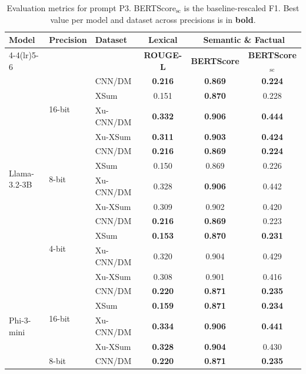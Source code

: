 \begin{table}[tbp]
\centering
\footnotesize
\setlength{\tabcolsep}{4pt}
\caption{Evaluation metrics for prompt P3. BERTScore$_{\mathrm{sc}}$ is the baseline-rescaled F1. Best value per model and dataset across precisions is in \textbf{bold}.}
\label{tab:eval-P3}
\begin{tabular}{lllccc}
\toprule
\multirow{2}{*}{\textbf{Model}} & \multirow{2}{*}{\textbf{Precision}} & \multirow{2}{*}{\textbf{Dataset}} & \textbf{Lexical} & \multicolumn{2}{c}{\textbf{Semantic \& Factual}} \\
\cmidrule(lr){4-4}\cmidrule(lr){5-6}
 & & & \textbf{ROUGE-L} & \textbf{BERTScore} & \textbf{BERTScore$_{\mathrm{sc}}$} \\
\midrule
\multirow{12}{*}{Llama-3.2-3B} & \multirow{4}{*}{16-bit} & CNN/DM & \textbf{0.216} & \textbf{0.869} & \textbf{0.224} \\
 &  & XSum & 0.151 & \textbf{0.870} & 0.228 \\
 &  & Xu-CNN/DM & \textbf{0.332} & \textbf{0.906} & \textbf{0.444} \\
 &  & Xu-XSum & \textbf{0.311} & \textbf{0.903} & \textbf{0.424} \\
\cmidrule(lr){2-6}
 & \multirow{4}{*}{8-bit} & CNN/DM & \textbf{0.216} & \textbf{0.869} & \textbf{0.224} \\
 &  & XSum & 0.150 & 0.869 & 0.226 \\
 &  & Xu-CNN/DM & 0.328 & \textbf{0.906} & 0.442 \\
 &  & Xu-XSum & 0.309 & 0.902 & 0.420 \\
\cmidrule(lr){2-6}
 & \multirow{4}{*}{4-bit} & CNN/DM & \textbf{0.216} & \textbf{0.869} & 0.223 \\
 &  & XSum & \textbf{0.153} & \textbf{0.870} & \textbf{0.231} \\
 &  & Xu-CNN/DM & 0.320 & 0.904 & 0.429 \\
 &  & Xu-XSum & 0.308 & 0.901 & 0.416 \\
\midrule
\multirow{12}{*}{Phi-3-mini} & \multirow{4}{*}{16-bit} & CNN/DM & \textbf{0.220} & \textbf{0.871} & \textbf{0.235} \\
 &  & XSum & \textbf{0.159} & \textbf{0.871} & \textbf{0.234} \\
 &  & Xu-CNN/DM & \textbf{0.334} & \textbf{0.906} & \textbf{0.441} \\
 &  & Xu-XSum & \textbf{0.328} & \textbf{0.904} & 0.430 \\
\cmidrule(lr){2-6}
 & \multirow{4}{*}{8-bit} & CNN/DM & \textbf{0.220} & \textbf{0.871} & \textbf{0.235} \\

\end{tabular}
\end{table}

